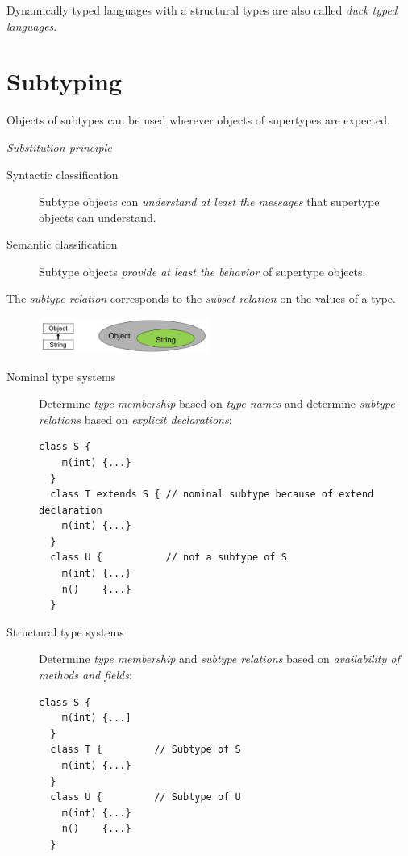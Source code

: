 Dynamically typed languages with a structural types are also called \emph{duck typed languages}.

\section{Subtyping}

\begin{shadequote}
  Objects of subtypes can be used wherever objects of supertypes are expected.\par\emph{Substitution principle}
\end{shadequote}

\begin{description}
 \item[Syntactic classification] Subtype objects can \emph{understand at least the messages} that supertype objects can understand.
 \item[Semantic classification] Subtype objects \emph{provide at least the behavior} of supertype objects.
\end{description}

The \emph{subtype relation} corresponds to the \emph{subset relation} on the values of a type.
\begin{figure}[h!]
  \centering
    \includegraphics[width=0.5\textwidth]{img/02_subtype_relation}
\end{figure}

\begin{description}
 \item[Nominal type systems] Determine \emph{type membership} based on \emph{type names} and determine \emph{subtype relations} based on \emph{explicit declarations}:
 \lstset{language=Java}
 \begin{lstlisting}[caption=nominally typed language]
  class S { 
    m(int) {...} 
  }
  class T extends S { // nominal subtype because of extend declaration
    m(int) {...} 
  }
  class U {           // not a subtype of S
    m(int) {...}
    n()    {...}
  }
 \end{lstlisting}
  \item[Structural type systems] Determine \emph{type membership} and \emph{subtype relations} based on \emph{availability of methods and fields}:
  \begin{lstlisting}[caption=structurally typed language]
  class S {
    m(int) {...]
  }
  class T {         // Subtype of S
    m(int) {...}
  }
  class U {         // Subtype of U
    m(int) {...}
    n()    {...}
  }
  \end{lstlisting}

\end{description}

